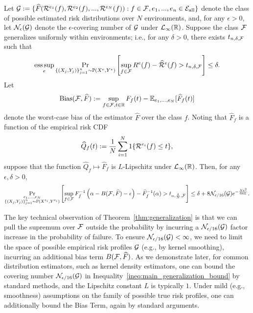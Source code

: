 \documentclass{article}
\begin{document}
\begin{theorem}
    Let $\mathcal{G} := \{ \widehat F(\mathcal{R}^{e_1}(f),\mathcal{R}^{e_2}(f),...,\mathcal{R}^{e_N}(f)) : f \in \mathcal{F}, e_1,...,e_n \in {\mathcal{E}_\text{all}} \}$ denote the class of possible estimated risk distributions over $N$ environments, and, for any $\epsilon > 0$, let $\mathcal{N}_\epsilon(\mathcal{G})$ denote the $\epsilon$-covering number of $\mathcal{G}$ under $\mathcal{L}_\infty(\mathbb{R})$.
    Suppose the class $\mathcal{F}$ generalizes uniformly within environments; i.e., for any $\delta > 0$, there exists $t_{n,\delta,\mathcal{F}}$ such that
    \[\operatorname*{ess\,sup}_e \Pr_{\{(X_j,Y_j)\}_{j = 1}^n \sim \mathbb{P}(X^e, Y^e)} \left[ \sup_{f \in \mathcal{F}} R^e(f) - \widehat {\mathcal{R}}^e(f) > t_{n,\delta,\mathcal{F}} \right] \leq \delta.\]
    Let
    \[\operatorname{Bias}(\mathcal{F}, \widehat F)
      := \sup_{f \in \mathcal{F}, t \in \mathbb{R}} F_f(t) - \operatorname{\mathbb{E}}_{e_1,...,e_N}[\widehat F_f(t)]\]
    denote the worst-case bias of the estimator $\widehat F$ over the class $f$.
    Noting that $\widehat F_f$ is a function of the empirical risk CDF
    \[\widehat Q_f(t) := \frac{1}{N} \sum_{i = 1}^N 1\{\mathcal{R}^{e_i}(f) \leq t\},\]
    suppose that the function $\widehat Q_f \mapsto \widehat F_f$ is $L$-Lipschitz under $\mathcal{L}_\infty(\mathbb{R})$.
    Then, for any $\epsilon,\delta > 0$,
    \begin{equation}
        \Pr_{\substack{e_1,...,e_N\\\{(X_j,Y_j)\}_{j = 1}^n \sim \mathbb{P}(X^{e_i}, Y^{e_i})}} \left[ \sup_{f \in \mathcal{F}} F^{-1}_f\left(\alpha - B(\mathcal{F}, \widehat F) - \epsilon \right) - \widehat F^{-1}_f(\alpha) > t_{n,\frac{\delta}{N},\mathcal{F}}
        \right]
        \leq \delta + 8 \mathcal{N}_{\epsilon/16}(\mathcal{G}) e^{-\frac{N\epsilon^2}{64L}}.
        \label{ineq:main_generalization_bound}
    \end{equation}
    \label{thm:generalization}
\end{theorem}
The key technical observation of Theorem~\ref{thm:generalization} is that we can pull the supremum over $\mathcal{F}$ outside the probability by incurring a $\mathcal{N}_{\epsilon/16}(\mathcal{G})$ factor increase in the probability of failure. To ensure $\mathcal{N}_{\epsilon/16}(\mathcal{G}) < \infty$, we need to limit the space of possible empirical risk profiles $\mathcal{G}$ (e.g., by kernel smoothing), incurring an additional bias term $B(\mathcal{F}, \widehat F)$. As we demonstrate later, for common distribution estimators, such as kernel density estimators, one can bound the covering number $\mathcal{N}_{\epsilon/16}(\mathcal{G})$ in Inequality~\eqref{ineq:main_generalization_bound} by standard methods, and the Lipschitz constant $L$ is typically $1$. Under mild (e.g., smoothness) assumptions on the family of possible true risk profiles, one can additionally bound the Bias Term, again by standard arguments.
\end{document}
